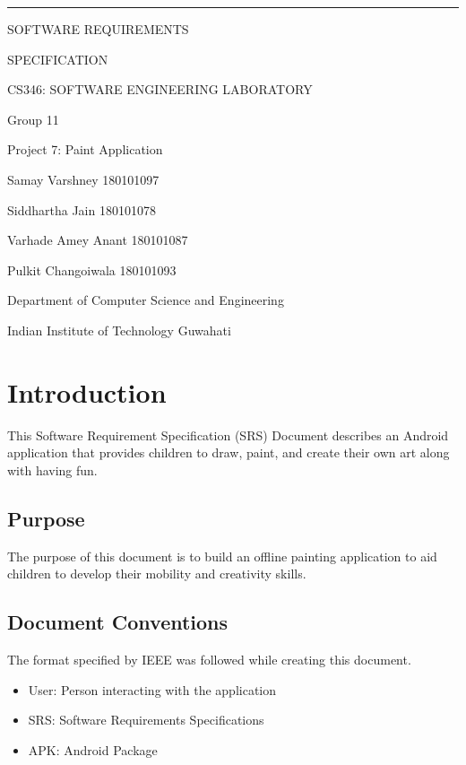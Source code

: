 \documentclass{scrreprt}
\date{}
\begin{document}
\begin{flushleft}
    \rule{14.5cm}{5pt}\vskip1cm
    \begin{bfseries}
        \huge{\centerline{SOFTWARE REQUIREMENTS}}
        \huge{\centerline{SPECIFICATION}}
        \vspace{1.5cm}
        \LARGE \centerline{CS346: SOFTWARE ENGINEERING LABORATORY} 
        \vspace{2cm}
        \LARGE \centerline{Group 11} 
        \LARGE \centerline{Project 7: Paint Application}
        \vspace{2cm}
        \LARGE \centerline{Samay Varshney  180101097}
        \centerline{Siddhartha Jain  180101078}
        \centerline{Varhade Amey Anant  180101087}
        \centerline{Pulkit Changoiwala  180101093}
        \vspace{4cm}
        \LARGE \centerline{Department of Computer Science and Engineering}
        \centerline{Indian Institute of Technology Guwahati}
        \vspace{1.9cm}
    \end{bfseries}
\end{flushleft}

\tableofcontents

\chapter{Introduction}
This Software Requirement Specification (SRS) Document describes an
Android application that provides children to draw, paint, and create their own art along with having fun. 

\section{Purpose}
The purpose of this document is to build an offline painting application to aid children to develop their mobility and creativity skills.

\section{Document Conventions}
The format specified by IEEE was followed while creating this document.
\begin{itemize}[itemsep=0.5pt]
    \item User: Person interacting with the application
    \item SRS: Software Requirements Specifications
    \item APK: Android Package
\end{itemize}
\end{document}
